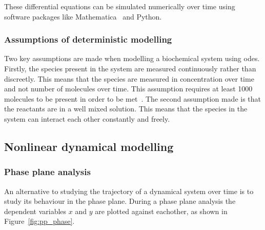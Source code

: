 \noindent These differential equations can be simulated numerically over time using software packages like Mathematica~\autocite{mathematica:2016} and Python.

\subsubsection{Assumptions of deterministic modelling}

Two key assumptions are made when modelling a biochemical system using \acrshort{ode}s. Firstly, the species present in the system are measured continuously rather than discreetly. This means that the species are measured in concentration over time and not number of molecules over time. This assumption requires at least 1000 molecules to be present in order to be met~\autocite{iglesias:2010}. The second assumption made is that the reactants are in a well mixed solution. This means that the species in the system can interact each other constantly and freely. 


\subsection{Nonlinear dynamical modelling}

\subsubsection{Phase plane analysis}
An alternative to studying the trajectory of a dynamical system over time is to study its behaviour in the phase plane. During a phase plane analysis the dependent variables $x$ and $y$ are plotted against eachother, as shown in Figure~\ref{fig:pp_phase}.

